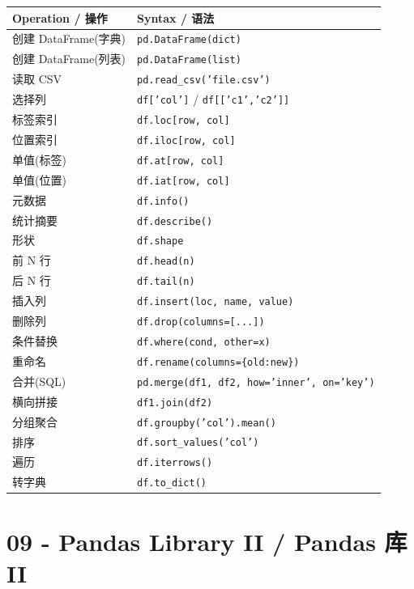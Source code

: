 \documentclass[11pt,a4paper]{report}
\let\oldtexttt\texttt
\renewcommand{\texttt}[1]{\textcolor{mainblue}{\oldtexttt{#1}}}
\begin{document}
\medskip
\centering
\small
\renewcommand{\arraystretch}{1.3}
\begin{tabular}{@{}ll@{}}
\toprule
\textbf{Operation / 操作} & \textbf{Syntax / 语法} \\ \midrule
创建 DataFrame(字典) & \texttt{pd.DataFrame(dict)} \\
创建 DataFrame(列表) & \texttt{pd.DataFrame(list)} \\
读取 CSV & \texttt{pd.read\_csv('file.csv')} \\
选择列 & \texttt{df['col']} / \texttt{df[['c1','c2']]} \\
标签索引 & \texttt{df.loc[row, col]} \\
位置索引 & \texttt{df.iloc[row, col]} \\
单值(标签) & \texttt{df.at[row, col]} \\
单值(位置) & \texttt{df.iat[row, col]} \\
元数据 & \texttt{df.info()} \\
统计摘要 & \texttt{df.describe()} \\
形状 & \texttt{df.shape} \\
前 N 行 & \texttt{df.head(n)} \\
后 N 行 & \texttt{df.tail(n)} \\
插入列 & \texttt{df.insert(loc, name, value)} \\
删除列 & \texttt{df.drop(columns=[...])} \\
条件替换 & \texttt{df.where(cond, other=x)} \\
重命名 & \texttt{df.rename(columns=\{old:new\})} \\
合并(SQL) & \texttt{pd.merge(df1, df2, how='inner', on='key')} \\
横向拼接 & \texttt{df1.join(df2)} \\
分组聚合 & \texttt{df.groupby('col').mean()} \\
排序 & \texttt{df.sort\_values('col')} \\
遍历 & \texttt{df.iterrows()} \\
转字典 & \texttt{df.to\_dict()} \\ \bottomrule
\end{tabular}
\medskip



\chapter{09 - Pandas Library II / Pandas 库 II}
\end{document}
